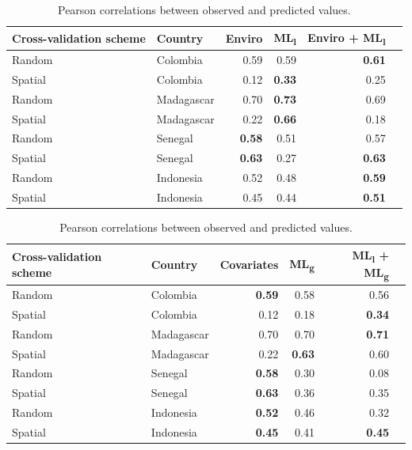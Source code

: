 \documentclass[11pt]{article}
\begin{document}
\begin{table}[h!]
\caption{Pearson correlations between observed and predicted values. }
\centering
\begin{tabular}{llrrrr}
Cross-validation scheme & Country &  Enviro &  ML\textsubscript{l} &  Enviro + ML\textsubscript{l} \\
\hline 
 Random &  Colombia & 0.59 & 0.59 & \textbf{0.61} \\
 Spatial &  Colombia &  0.12 &  \textbf{0.33} &  0.25\\
 Random &  Madagascar &  0.70 &  \textbf{0.73} & 0.69 \\
 Spatial &  Madagascar &  0.22 &  \textbf{0.66} & 0.18\\
 Random &  Senegal &  \textbf{0.58} &  0.51 & 0.57 \\
 Spatial &  Senegal &  \textbf{0.63} &  0.27 &  \textbf{0.63} \\
 Random &  Indonesia &  0.52 &  0.48 &  \textbf{0.59} \\
 Spatial &  Indonesia &  0.45 &  0.44 &  \textbf{0.51} \\
\end{tabular}
\label{t:results}
\end{table}





\begin{table}[h!]
\caption{Pearson correlations between observed and predicted values. }
\centering
\begin{tabular}{llrrrr}
Cross-validation scheme & Country &  Covariates &   ML\textsubscript{g} & ML\textsubscript{l} + ML\textsubscript{g} \\
\hline 
 Random &  Colombia & \textbf{0.59} &0.58 & 0.56 \\
 Spatial &  Colombia &  0.12 &  0.18 & \textbf{0.34}\\
 Random &  Madagascar &  0.70 &  0.70 & \textbf{0.71} \\
 Spatial &  Madagascar &  0.22 &  \textbf{0.63} & 0.60\\
 Random &  Senegal &  \textbf{0.58} &  0.30 & 0.08 \\
 Spatial &  Senegal &  \textbf{0.63} & 0.36 & 0.35 \\
 Random &  Indonesia &  \textbf{0.52} & 0.46 & 0.32 \\
 Spatial &  Indonesia &  \textbf{0.45} & 0.41 & \textbf{0.45} \\
\end{tabular}
\label{t:results}
\end{table}
\end{document}
